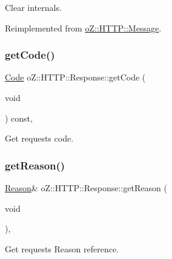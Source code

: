 Clear internals. 



Reimplemented from \mbox{\hyperlink{classo_z_1_1_h_t_t_p_1_1_message_a6521457d95eeca4fbffaf5bc55e5d16d}{o\+Z\+::\+H\+T\+T\+P\+::\+Message}}.

\mbox{\label{classo_z_1_1_h_t_t_p_1_1_response_aa2191a167fe53e8f0a8c2e64393cede0}} 
\subsubsection{\texorpdfstring{getCode()}{getCode()}}
{\footnotesize\ttfamily \mbox{\hyperlink{namespaceo_z_1_1_h_t_t_p_acd43703151305f79b1e2f42e98ee8199}{Code}} o\+Z\+::\+H\+T\+T\+P\+::\+Response\+::get\+Code (\begin{DoxyParamCaption}\item[{void}]{ }\end{DoxyParamCaption}) const\hspace{0.3cm}{\ttfamily [inline]}, {\ttfamily [noexcept]}}



Get request\textquotesingle{}s code. 

\mbox{\label{classo_z_1_1_h_t_t_p_1_1_response_a72ccc6e4aa64f1bf2c54218436631a26}} 
\subsubsection{\texorpdfstring{getReason()}{getReason()}\hspace{0.1cm}{\footnotesize\ttfamily [1/2]}}
{\footnotesize\ttfamily \mbox{\hyperlink{namespaceo_z_1_1_h_t_t_p_afcd8b91e5e8a7b6df0a7b3b298ec3965}{Reason}}\& o\+Z\+::\+H\+T\+T\+P\+::\+Response\+::get\+Reason (\begin{DoxyParamCaption}\item[{void}]{ }\end{DoxyParamCaption})\hspace{0.3cm}{\ttfamily [inline]}, {\ttfamily [noexcept]}}



Get request\textquotesingle{}s Reason reference. 

